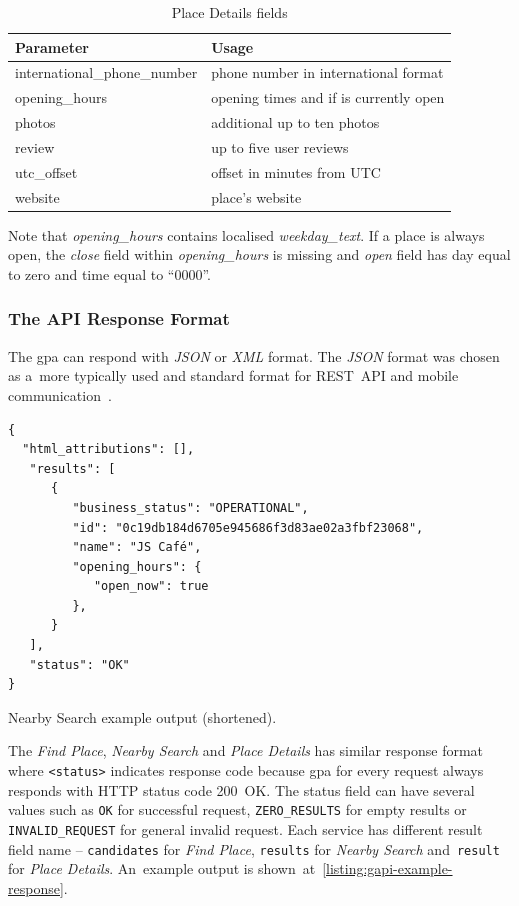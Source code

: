 \begin{table}[htbp]
\centering
\begin{tabularx}{\textwidth}{|l|X|}
\hline
\textbf{Parameter} & \textbf{Usage} \\ \hline
international\_phone\_number           & phone number in international format \\ \hline
opening\_hours           & opening times and if is currently open \\ \hline
photos                & additional up to ten photos \\ \hline
review           & up to five user reviews \\ \hline
utc\_offset           &  offset in minutes from UTC \\ \hline
website           & place's website \\ \hline
\end{tabularx}
\caption{Place Details fields}
\label{table:gapi-details-fields}
\end{table}

Note that \textit{opening\_hours} contains localised \textit{weekday\_text}. If a place is always open, the \textit{close} field within \textit{opening\_hours} is missing and \textit{open} field has day equal to zero and time equal to ``0000''.
\subsubsection{The API Response Format}
The \gls{gpa} can respond with \textit{JSON} or \textit{XML} format. The \textit{JSON} format was chosen as a~more typically used and standard format for REST~API and mobile communication~\cite{xml-vs-json}. 

\begin{listing}[h!]
\begin{verbatim}
{
  "html_attributions": [],
   "results": [      
      {
         "business_status": "OPERATIONAL",
         "id": "0c19db184d6705e945686f3d83ae02a3fbf23068",
         "name": "JS Café",
         "opening_hours": {
            "open_now": true
         },
      }
   ],
   "status": "OK"
}
\end{verbatim}
\caption{Nearby Search example output (shortened).}
\label{listing:gapi-example-response}
\end{listing}

The \textit{Find Place}, \textit{Nearby Search} and \textit{Place Details} has similar response format where \verb|<status>| indicates response code because \gls{gpa} for every request always responds with HTTP status code 200~OK. The status field can have several values such as \verb|OK| for successful request, \verb|ZERO_RESULTS| for empty results or \verb|INVALID_REQUEST| for general invalid request. Each service has different result field name -- \verb|candidates| for \textit{Find Place}, \verb|results| for \textit{Nearby Search} and~\verb|result| for \textit{Place Details}. An~example output is shown~at~\cref{listing:gapi-example-response}.
